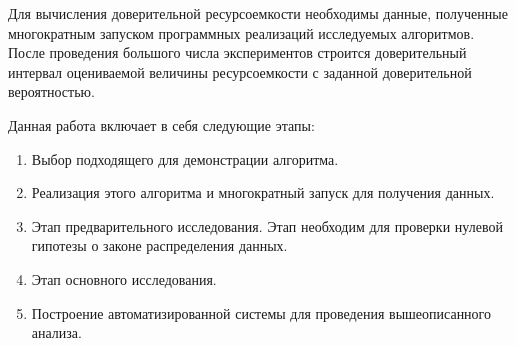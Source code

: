 
Для вычисления доверительной ресурсоемкости необходимы данные, полученные многократным запуском программных реализаций исследуемых алгоритмов. После проведения большого числа экспериментов строится доверительный интервал оцениваемой величины ресурсоемкости с заданной доверительной вероятностью.

Данная работа включает в себя следующие этапы:
\begin{enumerate}
\item Выбор подходящего для демонстрации алгоритма.
\item Реализация этого алгоритма и многократный запуск для получения данных.
\item Этап предварительного исследования. Этап необходим для проверки нулевой гипотезы о законе распределения данных.
\item Этап основного исследования.
\item Построение автоматизированной системы для проведения вышеописанного анализа.
\end{enumerate}


\pagebreak